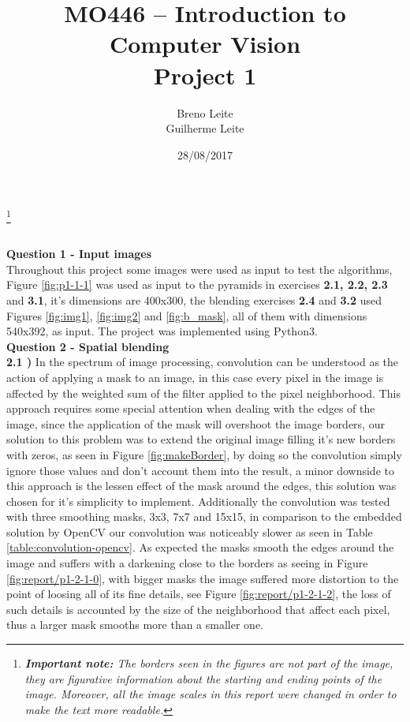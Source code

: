 \documentclass[12pt,a4paper]{article}
\title{MO446 -- Introduction to Computer Vision  \\ Project 1}
\author{Breno Leite  \\ Guilherme Leite}
\date{28/08/2017}
\newcommand\blfootnote[1]{%
	\begingroup
	\renewcommand\thefootnote{}\footnote{#1}%
	\addtocounter{footnote}{-1}%
	\endgroup
}
\begin{document}
\maketitle
\blfootnote{\textit{\textbf{Important note:} The borders seen in the figures are not part of the image, they are figurative information about the starting and ending points of the image. Moreover, all the image scales in this report were changed in order to make the text more readable.}} \\


\textbf{Question 1 - Input images}\\

Throughout this project some images were used as input to test the algorithms, Figure \ref{fig:p1-1-1} was used as input to the pyramids in exercises \textbf{2.1, 2.2, 2.3} and \textbf{3.1}, it's dimensions are 400x300, the blending exercises \textbf{2.4} and \textbf{3.2} used Figures \ref{fig:img1}, \ref{fig:img2} and \ref{fig:b_mask}, all of them with dimensions 540x392, as input. The project was implemented using Python3.\\

\textbf{Question 2 - Spatial blending}\\

\textbf{2.1 )} In the spectrum of image processing, convolution can be understood as the action of applying a mask to an image, in this case every pixel in the image is affected by the weighted sum of the filter applied to the pixel neighborhood. This approach requires some special attention when dealing with the edges of the image, since the application of the mask will overshoot the image borders, our solution to this problem was to extend the original image filling it's new borders with zeros, as seen in Figure \ref{fig:makeBorder}, by doing so the convolution simply ignore those values and don't account them into the result, a minor downside to this approach is the lessen effect of the mask around the edges, this solution was chosen for it's simplicity to implement. Additionally the convolution was tested with three smoothing masks, 3x3, 7x7 and 15x15, in comparison to the embedded solution by OpenCV our convolution was noticeably slower as seen in Table \ref{table:convolution-opencv}. As expected the masks smooth the edges around the image and suffers with a darkening close to the borders as seeing in Figure \ref{fig:report/p1-2-1-0}, with bigger masks the image suffered more distortion to the point of loosing all of its fine details, see Figure \ref{fig:report/p1-2-1-2}, the loss of such details is accounted by the size of the neighborhood that affect each pixel, thus a larger mask smooths more than a smaller one.\\
\end{document}
